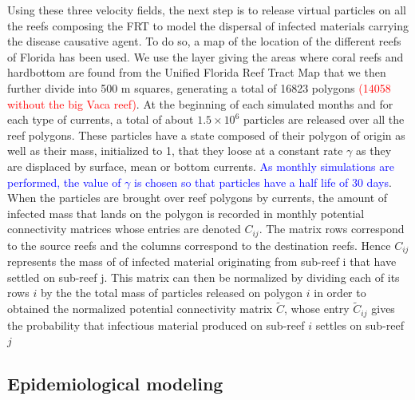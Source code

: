 \documentclass[utf8]{frontiersSCNS}
\begin{document}
Using these three velocity fields, the next step is to release virtual particles on all the reefs composing the FRT to model the dispersal of infected materials carrying the disease causative agent. To do so, a map of the location of the different reefs of Florida has been used. We use the layer giving the areas where coral reefs and hardbottom are found from the Unified Florida Reef Tract Map \citep{fwc2017unified} that we then further divide into 500 m squares, generating a total of 16823 polygons \textcolor{red}{(14058 without the big Vaca reef)}. At the beginning of each simulated months and for each type of currents, a total of about $1.5 \times 10^6$ particles are released over all the reef polygons. These particles have a state composed of their polygon of origin as well as their mass, initialized to 1, that they loose at a constant rate $\gamma$ as they are displaced by surface, mean or bottom currents. \textcolor{blue}{As monthly simulations are performed, the value of $\gamma$ is chosen so that particles have a half life of 30 days}. When the particles are brought over reef polygons by currents, the amount of infected mass that lands on the polygon is recorded in monthly potential connectivity matrices whose entries are denoted $C_{ij}$. The matrix rows correspond to the source reefs and the columns correspond to the destination reefs. Hence $C_{ij}$ represents the mass of of infected material originating from sub-reef i that have settled on sub-reef j. This matrix can then be normalized by dividing each of its rows $i$ by the the total mass of particles released on polygon $i$ in order to obtained the normalized potential connectivity matrix $\tilde{C}$, whose entry $\tilde{C}_{ij}$ gives the probability that infectious material produced on sub-reef $i$ settles on sub-reef $j$

\subsection{Epidemiological modeling}
\end{document}
